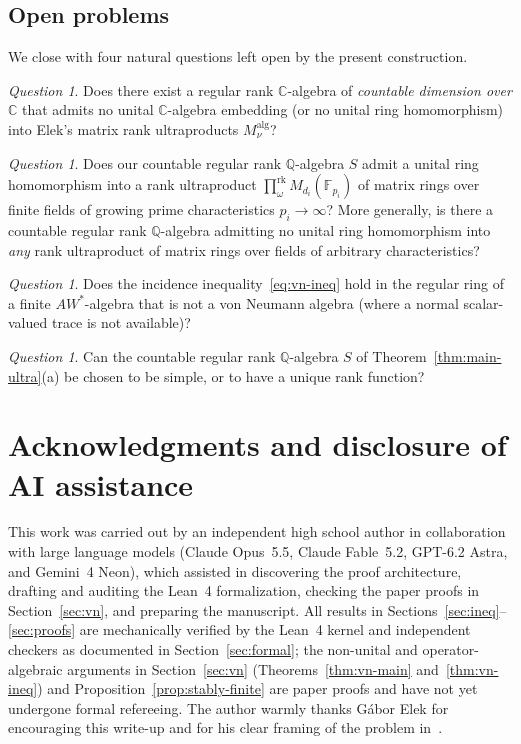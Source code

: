 \documentclass[11pt]{article}
\theoremstyle{definition}
\theoremstyle{remark}
\newtheorem{question}[theorem]{Question}
\numberwithin{equation}{section}
\newcommand{\RUF}[3]{\prod_{#1}^{\mathrm{rk}} M_{#2}(#3)}
\newcommand{\Q}{\mathbb{Q}}
\newcommand{\C}{\mathbb{C}}
\newcommand{\F}{\mathbb{F}}
\newcommand{\1}{\mathbf{1}}
\begin{document}
\subsection{Open problems}

We close with four natural questions left open by the present construction.

\begin{question}
Does there exist a regular rank $\C$-algebra of \emph{countable dimension over $\C$} that admits no unital $\C$-algebra embedding (or no unital ring homomorphism) into Elek's matrix rank ultraproducts $M^{\mathrm{alg}}_\nu$?
\end{question}

\begin{question}
Does our countable regular rank $\Q$-algebra $S$ admit a unital ring homomorphism into a rank ultraproduct $\RUF{\omega}{d_i}{\F_{p_i}}$ of matrix rings over finite fields of growing prime characteristics $p_i \to \infty$? More generally, is there a countable regular rank $\Q$-algebra admitting no unital ring homomorphism into \emph{any} rank ultraproduct of matrix rings over fields of arbitrary characteristics?
\end{question}

\begin{question}
Does the incidence inequality~\eqref{eq:vn-ineq} hold in the regular ring of a finite $AW^*$-algebra that is not a von Neumann algebra (where a normal scalar-valued trace is not available)?
\end{question}

\begin{question}
Can the countable regular rank $\Q$-algebra $S$ of Theorem~\ref{thm:main-ultra}\textup{(a)} be chosen to be simple, or to have a unique rank function?
\end{question}

\section*{Acknowledgments and disclosure of AI assistance}

This work was carried out by an independent high school author in collaboration with large language models (Claude Opus~5.5, Claude Fable~5.2, GPT-6.2 Astra, and Gemini~4 Neon), which assisted in discovering the proof architecture, drafting and auditing the Lean~4 formalization, checking the paper proofs in Section~\ref{sec:vn}, and preparing the manuscript. All results in Sections~\ref{sec:ineq}--\ref{sec:proofs} are mechanically verified by the Lean~4 kernel and independent checkers as documented in Section~\ref{sec:formal}; the non-unital and operator-algebraic arguments in Section~\ref{sec:vn} (Theorems~\ref{thm:vn-main} and~\ref{thm:vn-ineq}) and Proposition~\ref{prop:stably-finite} are paper proofs and have not yet undergone formal refereeing. The author warmly thanks G\'abor Elek for encouraging this write-up and for his clear framing of the problem in~\cite{Elek2013}.
\end{document}
